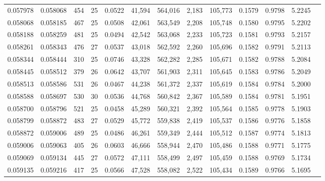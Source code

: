\begin{tabular}{rrrrrrrrrrrrr}
0.057978 & 0.058068 & 454 &  25 &                                     0.0522 &  41,594 & 564,016 &   2,183 & 105,773 & 0.1579 & 0.9798 & 5.2245 \\
0.058068 & 0.058185 & 467 &  25 &                                     0.0508 &  42,061 & 563,549 &   2,208 & 105,748 & 0.1580 & 0.9795 & 5.2202 \\
0.058188 & 0.058259 & 481 &  25 &                                     0.0494 &  42,542 & 563,068 &   2,233 & 105,723 & 0.1581 & 0.9793 & 5.2157 \\
0.058261 & 0.058343 & 476 &  27 &                                     0.0537 &  43,018 & 562,592 &   2,260 & 105,696 & 0.1582 & 0.9791 & 5.2113 \\
0.058344 & 0.058444 & 310 &  25 &                                     0.0746 &  43,328 & 562,282 &   2,285 & 105,671 & 0.1582 & 0.9788 & 5.2084 \\
0.058445 & 0.058512 & 379 &  26 &                                     0.0642 &  43,707 & 561,903 &   2,311 & 105,645 & 0.1583 & 0.9786 & 5.2049 \\
0.058513 & 0.058586 & 531 &  26 &                                     0.0467 &  44,238 & 561,372 &   2,337 & 105,619 & 0.1584 & 0.9784 & 5.2000 \\
0.058588 & 0.058697 & 530 &  30 &                                     0.0536 &  44,768 & 560,842 &   2,367 & 105,589 & 0.1584 & 0.9781 & 5.1951 \\
0.058700 & 0.058796 & 521 &  25 &                                     0.0458 &  45,289 & 560,321 &   2,392 & 105,564 & 0.1585 & 0.9778 & 5.1903 \\
0.058799 & 0.058872 & 483 &  27 &                                     0.0529 &  45,772 & 559,838 &   2,419 & 105,537 & 0.1586 & 0.9776 & 5.1858 \\
0.058872 & 0.059006 & 489 &  25 &                                     0.0486 &  46,261 & 559,349 &   2,444 & 105,512 & 0.1587 & 0.9774 & 5.1813 \\
0.059006 & 0.059063 & 405 &  26 &                                     0.0603 &  46,666 & 558,944 &   2,470 & 105,486 & 0.1588 & 0.9771 & 5.1775 \\
0.059069 & 0.059134 & 445 &  27 &                                     0.0572 &  47,111 & 558,499 &   2,497 & 105,459 & 0.1588 & 0.9769 & 5.1734 \\
0.059135 & 0.059216 & 417 &  25 &                                     0.0566 &  47,528 & 558,082 &   2,522 & 105,434 & 0.1589 & 0.9766 & 5.1695 \\

\end{tabular}
